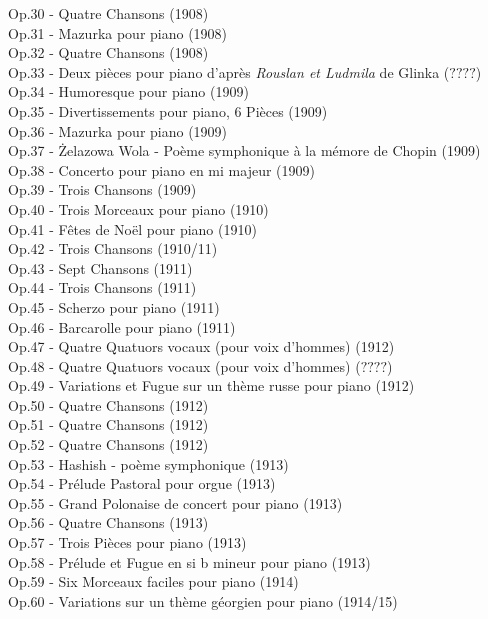 Op.30 - Quatre Chansons (1908)\\
Op.31 - Mazurka  pour piano (1908)\\
Op.32 - Quatre Chansons (1908)\\
Op.33 - Deux pièces pour piano d'après \emph{Rouslan et Ludmila} de Glinka ($????$)\\
Op.34 - Humoresque pour piano (1909)\\
Op.35 - Divertissements pour piano, 6 Pièces (1909)\\
Op.36 - Mazurka  pour piano (1909)\\
Op.37 - Żelazowa Wola - Poème symphonique à la mémore de Chopin (1909)\\
Op.38 - Concerto pour piano  en mi majeur (1909)\\
Op.39 - Trois Chansons (1909)\\
Op.40 - Trois Morceaux pour piano (1910)\\
Op.41 - Fêtes de Noël pour piano (1910)\\
Op.42 - Trois Chansons (1910/11)\\
Op.43 - Sept Chansons (1911)\\
Op.44 - Trois Chansons (1911)\\
Op.45 - Scherzo pour piano (1911)\\
Op.46 - Barcarolle pour piano (1911)\\
Op.47 - Quatre Quatuors vocaux (pour voix d'hommes) (1912)\\
Op.48 - Quatre Quatuors vocaux (pour voix d'hommes) ($????$)\\
Op.49 - Variations et Fugue sur un thème russe pour piano (1912)\\
Op.50 - Quatre Chansons (1912)\\
Op.51 - Quatre Chansons (1912)\\
Op.52 - Quatre Chansons (1912)\\
Op.53 - Hashish - poème symphonique (1913)\\
Op.54 - Prélude Pastoral pour orgue (1913)\\
Op.55 - Grand Polonaise de concert pour piano (1913)\\
Op.56 - Quatre Chansons (1913)\\
Op.57 - Trois Pièces pour piano (1913)\\
Op.58 - Prélude et Fugue en si b mineur pour piano (1913)\\
Op.59 - Six Morceaux faciles pour piano (1914)\\
Op.60 - Variations sur un thème géorgien pour piano (1914/15)\\
